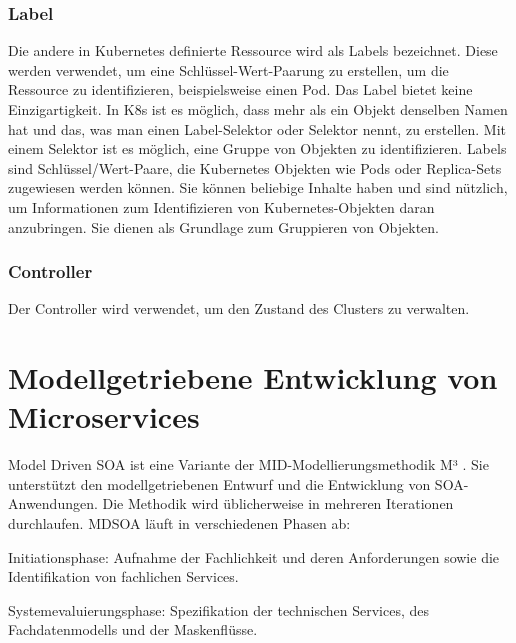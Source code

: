 {\subsubsection{Label}

Die andere in Kubernetes definierte Ressource wird als Labels bezeichnet. Diese werden verwendet, um eine Schlüssel-Wert-Paarung zu erstellen, um die Ressource zu identifizieren, beispielsweise einen Pod. Das Label bietet keine Einzigartigkeit. In K8s ist es möglich, dass mehr als ein Objekt denselben Namen hat und das, was man einen Label-Selektor oder Selektor nennt, zu erstellen.
Mit einem Selektor ist es möglich, eine Gruppe von Objekten zu identifizieren. \cite[S.80-81]{riti}
Labels sind Schlüssel/Wert-Paare, die Kubernetes Objekten wie Pods oder Replica-Sets zugewiesen werden können. Sie können beliebige Inhalte haben und sind nützlich, um Informationen zum Identifizieren von Kubernetes-Objekten daran anzubringen. Sie dienen als Grundlage zum Gruppieren von Objekten. \cite[S.???]{burns1}

\subsubsection{Controller}

Der Controller wird verwendet, um den Zustand des Clusters zu verwalten. \cite[S.80-81]{riti}


%
%

\pagebreak 
\section{Modellgetriebene Entwicklung von Microservices}

Model Driven SOA ist eine Variante der MID-Modellierungsmethodik M³ . Sie unterstützt den modellgetriebenen Entwurf und die Entwicklung von SOA-Anwendungen. Die Methodik wird üblicherweise in mehreren Iterationen durchlaufen. MDSOA läuft in verschiedenen Phasen ab:

Initiationsphase: Aufnahme der Fachlichkeit und deren Anforderungen sowie die Identifikation von fachlichen Services.

Systemevaluierungsphase: Spezifikation der technischen Services, des Fachdatenmodells und der Maskenflüsse.

}
